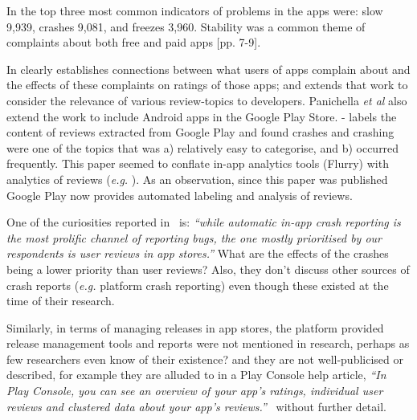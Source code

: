 In \textcite[p. 5][]{fu2013_why_people_hate_your_app_making_sense_of_user_feedback_in_a_mobile_app_store} the top three most common indicators of problems in the apps were: slow 9,939, crashes 9,081, and freezes 3,960. Stability was a common theme of complaints about both free and paid apps [pp. 7-9]. 

In  clearly establishes connections between what users of  apps complain about and the effects of these complaints on ratings of those apps; and  extends that work to consider the relevance of various review-topics to developers. Panichella \emph{et al} also extend the work to include Android apps in the Google Play Store.  - labels the content of reviews extracted from Google Play and found crashes and crashing were one of the topics that was a) relatively easy to categorise, and b) occurred frequently. This paper seemed to conflate in-app analytics tools (Flurry) with analytics of reviews (\emph{e.g.} ). As an observation, since this paper was published Google Play now provides automated labeling and analysis of reviews.

One of the curiosities reported in~ is: \emph{``while automatic in-app crash reporting is the most prolific channel of reporting bugs, the one mostly prioritised by our respondents is user reviews in app stores.''} What are the effects of the crashes being a lower priority than user reviews? Also, they don't discuss other sources of crash reports (\emph{e.g.} platform crash reporting) even though these existed at the time of their research.

Similarly, in terms of managing releases in app stores, the platform provided release management tools and reports were not mentioned in research, perhaps as few researchers even know of their existence? and they are not well-publicised or described, for example they are alluded to in a Play Console help article, \emph{``In Play Console, you can see an overview of your app's ratings, individual user reviews and clustered data about your app's reviews.''}~ without further detail.

